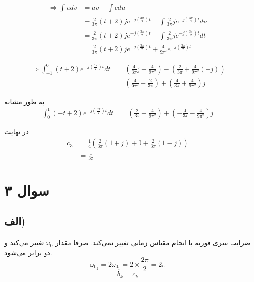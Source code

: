 \documentclass{article}
\begin{document}
	\begin{align*}
		\Rightarrow
		\int_{}^{} u dv &= uv - \int_{}^{} vdu \\
		&= \frac{2}{3\pi} (t+2) j e^{-j(\frac{3\pi}{2})t}
		- \int_{}^{} \frac{2}{3\pi} j e^{-j(\frac{3\pi}{2})t} du \\
		&= \frac{2}{3\pi} (t+2) j e^{-j(\frac{3\pi}{2})t}
		- \int_{}^{} \frac{2}{3\pi} j e^{-j(\frac{3\pi}{2})t} dt \\
		&= \frac{2}{3\pi} (t+2) j e^{-j(\frac{3\pi}{2})t}
		+ \frac{4}{9\pi^2} e^{-j(\frac{3\pi}{2})t}
	\end{align*}

	\begin{align*}
		\Rightarrow
		\int_{-1}^{0} (t+2) e^{-j(\frac{3\pi}{2})t} dt
		&= \left(\frac{4}{3\pi} j + \frac{4}{9\pi^2}\right)
		- \left(\frac{2}{3\pi} + \frac{4}{9\pi^2}(-j)\right) \\
		&= \left(\frac{4}{9\pi^2} - \frac{2}{3\pi}\right)
		+ \left(\frac{4}{3\pi} + \frac{4}{9\pi^2}\right)j
	\end{align*}

	به طور مشابه
	\begin{align*}
		\int_{0}^{1} (-t+2) e^{-j(\frac{3\pi}{2})t} dt
		&= \left(\frac{2}{3\pi} - \frac{4}{9\pi^2}\right)
		+ \left(-\frac{4}{3\pi} - \frac{4}{9\pi^2}\right)j
	\end{align*}

	در نهایت
	\begin{align*}
		a_3 &=
		\frac{1}{4} \left( \frac{2}{3\pi} (1+j)
		+ 0
		+ \frac{2}{3\pi} (1-j)
		\right) \\
		&= \frac{1}{3\pi}
	\end{align*}

	\section*{سوال ۳}
	\subsection*{الف)}
	\paragraph*{}
	ضرایب سری فوریه با انجام مقیاس زمانی تغییر نمی‌کند. صرفا مقدار
	$\omega_0$
	تغییر می‌کند و دو برابر می‌شود.
	\begin{equation*}
		\omega_{0_2} = 2\omega_{0_1} = 2 \times \frac{2\pi}{2} = 2\pi
	\end{equation*}
	\begin{equation*}
		b_k = c_k
	\end{equation*}
\end{document}
